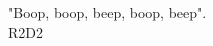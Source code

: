 \begin{epigrafe}
  \vspace*{\fill}
  \begin{otherlanguage}{english}
    \begin{flushright}
      \begin{SingleSpace}
       "Boop, boop, beep, boop, beep".\\ 
        R2D2
      \end{SingleSpace}
    \end{flushright}
  \end{otherlanguage}
\end{epigrafe}